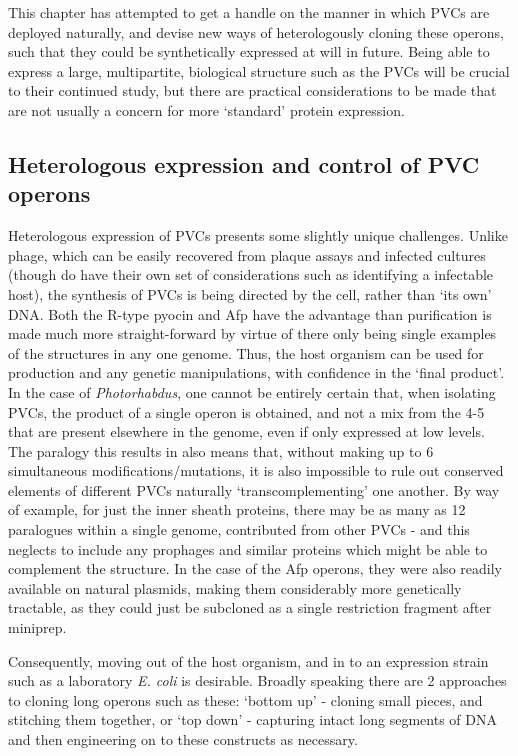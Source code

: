 This chapter has attempted to get a handle on the manner in which PVCs are deployed naturally, and devise new ways of heterologously cloning these operons, such that they could be synthetically expressed at will in future. Being able to express a large, multipartite, biological structure such as the PVCs will be crucial to their continued study, but there are practical considerations to be made that are not usually a concern for more `standard' protein expression.

\subsection{Heterologous expression and control of PVC operons}
Heterologous expression of PVCs presents some slightly unique challenges. Unlike phage, which can be easily recovered from plaque assays and infected cultures (though do have their own set of considerations such as identifying a infectable host), the synthesis of PVCs is being directed by the cell, rather than `its own' DNA. Both the R-type pyocin and Afp have the advantage than purification is made much more straight-forward by virtue of there only being single examples of the structures in any one genome. Thus, the host organism can be used for production and any genetic manipulations, with confidence in the `final product'. In the case of \emph{Photorhabdus}, one cannot be entirely certain that, when isolating PVCs, the product of a single operon is obtained, and not a mix from the 4-5 that are present elsewhere in the genome, even if only expressed at low levels. The paralogy this results in also means that, without making up to 6 simultaneous modifications/mutations, it is also impossible to rule out conserved elements of different PVCs naturally `transcomplementing' one another. By way of example, for just the inner sheath proteins, there may be as many as 12 paralogues within a single genome, contributed from other PVCs - and this neglects to include any prophages and similar proteins which might be able to complement the structure. In the case of the Afp operons, they were also readily available on natural plasmids, making them considerably more genetically tractable, as they could just be subcloned as a single restriction fragment after miniprep.

Consequently, moving out of the host organism, and in to an expression strain such as a laboratory \emph{E. coli} is desirable. Broadly speaking there are 2 approaches to cloning long operons such as these: `bottom up' - cloning small pieces, and stitching them together, or `top down' - capturing intact long segments of DNA and then engineering on to these constructs as necessary.

